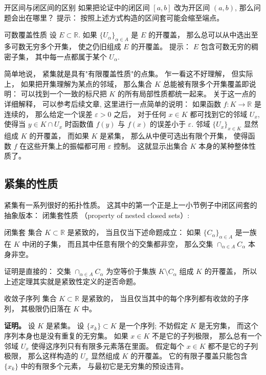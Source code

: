 \begin{exercise}{开区间与闭区间的区别}
如果把论证中的闭区间 $[a,b]$ 改为开区间 $(a,b)$, 那么问题会出在哪里？ 提示： 按照上述方式构造的区间套可能会缩至端点。
\end{exercise}

\begin{exercise}{可数覆盖性质}
设 $E\subset\mathbb{R}$. 如果 $\{U_\alpha\}_{\alpha\in A}$ 是 $E$ 的开覆盖， 那么总可以从中选出至多可数无穷多个开集， 使之仍旧组成 $E$ 的开覆盖。 提示： $E$ 包含可数无穷的稠密子集， 其中每一点都属于某个 $U_\alpha$.
\end{exercise}

简单地说， 紧集就是具有"有限覆盖性质"的点集。 乍一看这不好理解， 但实际上， 如果把开集理解为某点的邻域， 那么集合 $K$ 总能被有限多个开集覆盖即说明： 可以找到一个一致的标尺把 $K$ 的所有局部性质都统一起来。 关于这一点的详细解释， 可以参考后续文章, 这里进行一点简单的说明： 如果函数 $f:K\to\mathbb{R}$ 是连续的， 那么给定一个误差 $\varepsilon>0$ 之后， 对于任何 $x\in K$ 都可找到它的邻域 $U_{x}$, 使得当 $y\in K\cap U_x$ 时函数值 $f(y)$ 与 $f(x)$ 的误差小于 $\varepsilon$. 邻域 $\{U_x\}_{x\in K}$ 显然组成 $K$ 的开覆盖， 而如果 $K$ 是紧集， 那么从中便可选出有限个开集， 使得函数 $f$ 在这些开集上的振幅都可用 $\varepsilon$ 控制。 这就显示出集合 $K$ 本身的某种整体性质了。

\subsection{紧集的性质}
紧集有一系列很好的拓扑性质。 这其中的第一个正是上一小节例子中闭区间套的抽象版本： 闭集套性质 （property of nested closed sets）:

\begin{theorem}{闭集套}
集合 $K\subset\mathbb{R}$ 是紧致的， 当且仅当下述命题成立： 如果 $\{C_\alpha\}_{\alpha\in A}$ 是一族在 $K$ 中闭的子集， 而且其中任意有限个的交集都非空， 那么交集 $\cap_{\alpha\in A}C_\alpha$ 本身非空。 
\end{theorem}

证明是直接的： 交集 $\cap_{\alpha\in A}C_\alpha$ 为空等价于集族 $K\setminus C_\alpha$ 组成 $K$ 的开覆盖， 所以上述定理其实就是紧致性定义的逆否命题。

\begin{theorem}{收敛子序列}
集合 $K\subset\mathbb{R}$ 是紧致的， 当且仅当其中的每个序列都有收敛的子序列， 其极限仍旧落在 $K$ 中。
\end{theorem}

\textbf{证明。} 设 $K$ 是紧集。 设 $\{x_k\}\subset K$ 是一个序列; 不妨假定 $K$ 是无穷集， 而这个序列本身也是没有重复的无穷集。 如果 $x\in K$ 不是它的子列极限， 那么总有一个邻域 $U_x$ 使得这序列只有有限多元素落在里面。 假定每个 $x\in K$ 都不是它的子列极限， 那么这样构造的 $U_x$ 显然组成 $K$ 的开覆盖。 它的有限子覆盖只能包含 $\{x_k\}$ 中的有限多个元素， 与最初它是无穷集的预设违背。

